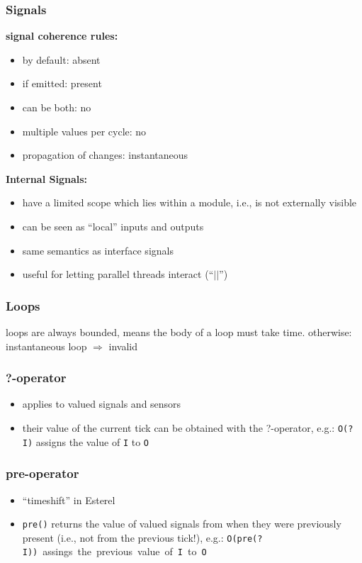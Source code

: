 \documentclass[fs, footer]{latex4ei}
\begin{document}
\begin{multicols*}{4}
{\subsubsection{Signals}
\textbf{signal coherence rules:}
\begin{itemize}
\item by default: absent
\item if emitted: present
\item can be both: no
\item multiple values per cycle: no
\item propagation of changes: instantaneous
\end{itemize}
\textbf{Internal Signals:}
\begin{itemize}
\item have a limited scope which lies within a module, i.e., is not externally visible
\item can be seen as "`local"' inputs and outputs
\item same semantics as interface signals
\item useful for letting parallel threads interact ("`$||$"')
\end{itemize}

\subsubsection{Loops}
loops are always bounded, means the body of a loop must take time. otherwise: instantaneous loop $\Rightarrow$ invalid

\subsubsection{?-operator}
\begin{itemize}
\item applies to valued signals and sensors
\item their value of the current tick can be obtained with the ?-operator, e.g.: \texttt{O(?I)} assigns the value of \texttt{I} to \texttt{O}
\end{itemize}

\subsubsection{pre-operator}
\begin{itemize}
\item "`timeshift"' in Esterel
\item \texttt{pre()} returns the value of valued signals from when they were previously present (i.e., not from the
previous tick!), e.g.: \mbox{\texttt{O(pre(?I))} assings the previous value of \texttt{I} to \texttt{O}}
\end{itemize}

}
\end{multicols*}
\end{document}
